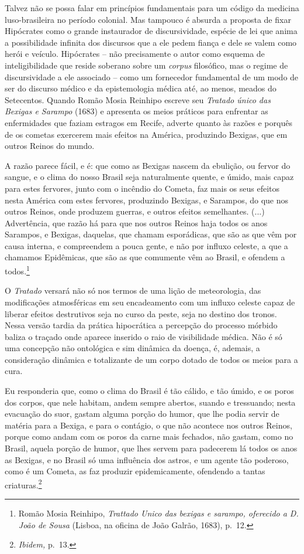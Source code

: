 Talvez não se possa falar em princípios fundamentais para um código da
medicina luso-brasileira no período colonial. Mas tampouco é absurda a
proposta de fixar Hipócrates como o grande instaurador de
discursividade, espécie de lei que anima a possibilidade infinita dos
discursos que a ele pedem fiança e dele se valem como herói e veículo.
Hipócrates -- não precisamente o autor como esquema de inteligibilidade
que reside soberano sobre um \emph{corpus} filosófico, mas o regime de
discursividade a ele associado -- como um fornecedor fundamental de um
modo de ser do discurso médico e da epistemologia médica até, ao menos,
meados do Setecentos. Quando Romão Mosia Reinhipo escreve seu
\emph{Tratado único das Bexigas e Sarampo} (1683) e apresenta os meios
práticos para enfrentar as enfermidades que faziam estragos em Recife,
adverte quanto às razões e porquês de os cometas exercerem mais efeitos
na América, produzindo Bexigas, que em outros Reinos do mundo.

A razão parece fácil, e é: que como as Bexigas nascem da ebulição, ou
fervor do sangue, e o clima do nosso Brasil seja naturalmente quente, e
úmido, mais capaz para estes fervores, junto com o incêndio do Cometa,
faz mais os seus efeitos nesta América com estes fervores, produzindo
Bexigas, e Sarampos, do que nos outros Reinos, onde produzem guerras, e
outros efeitos semelhantes. (...) Advertência, que razão há para que nos
outros Reinos haja todos os anos Sarampos, e Bexigas, daquelas, que
chamam esporádicas, que são as que vêm por causa interna, e compreendem
a pouca gente, e não por influxo celeste, a que a chamamos Epidêmicas,
que são as que comumente vêm ao Brasil, e ofendem a todos.\footnote{Romão
  Mosia Reinhipo, \emph{Trattado Unico das bexigas e sarampo, oferecido
  a D. João de Sousa} (Lisboa, na oficina de João Galrão, 1683), p.~12.}

O \emph{Tratado} versará não só nos termos de uma lição de meteorologia,
das modificações atmosféricas em seu encadeamento com um influxo celeste
capaz de liberar efeitos destrutivos seja no curso da peste, seja no
destino dos tronos. Nessa versão tardia da prática hipocrática a
percepção do processo mórbido baliza o traçado onde aparece inserido o
raio de visibilidade médica. Não é só uma concepção não ontológica e sim
dinâmica da doença, é, ademais, a consideração dinâmica e totalizante de
um corpo dotado de todos os meios para a cura.

Eu responderia que, como o clima do Brasil é tão cálido, e tão úmido, e
os poros dos corpos, que nele habitam, andem sempre abertos, suando e
tressuando; nesta evacuação do suor, gastam alguma porção do humor, que
lhe podia servir de matéria para a Bexiga, e para o contágio, o que não
acontece nos outros Reinos, porque como andam com os poros da carne mais
fechados, não gastam, como no Brasil, aquela porção de humor, que lhes
servem para padecerem lá todos os anos as Bexigas, e no Brasil só uma
influência dos astros, e um agente tão poderoso, como é um Cometa, as
faz produzir epidemicamente, ofendendo a tantas criaturas.\footnote{\emph{Ibidem,}
  p.~13.}

